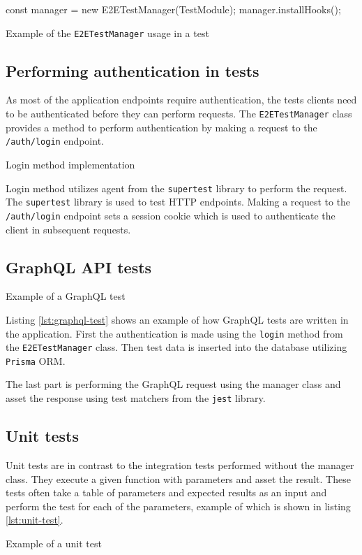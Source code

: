 \documentclass[../main.tex]{subfiles}
\begin{document}
\begin{listing}[H]
  \begin{tscode}
    const manager = new E2ETestManager(TestModule);
    manager.installHooks();
  \end{tscode}
  \caption{Example of the \texttt{E2ETestManager} usage in a test}
\end{listing}

\subsection{Performing authentication in tests}

As most of the application endpoints require authentication, the tests clients need to be authenticated before they can perform requests.
The \texttt{E2ETestManager} class provides a method to perform authentication by making a request to the \texttt{/auth/login} endpoint.

\begin{listing}[H]
  \caption{Login method implementation}
\end{listing}

Login method utilizes agent from the \texttt{supertest} library to perform the request. The \texttt{supertest} library is used to test HTTP endpoints.
Making a request to the \texttt{/auth/login} endpoint sets a session cookie which is used to authenticate the client in subsequent requests.

\subsection{GraphQL API tests}

\begin{listing}[H]
  \caption{Example of a GraphQL test}
  \label{lst:graphql-test}
\end{listing}

Listing \ref{lst:graphql-test} shows an example of how GraphQL tests are written in the application.
First the authentication is made using the \texttt{login} method from the \texttt{E2ETestManager} class.
Then test data is inserted into the database utilizing \texttt{Prisma} ORM.

The last part is performing the GraphQL request using the manager class and asset the response using test matchers from the \texttt{jest} library.

\subsection{Unit tests}

Unit tests are in contrast to the integration tests performed without the manager class. They execute a given function with parameters and asset the result.
These tests often take a table of parameters and expected results as an input and perform the test for each of the parameters, example of which is shown in listing \ref{lst:unit-test}.

\begin{listing}[H]
  \caption{Example of a unit test}
  \label{lst:unit-test}
\end{listing}
\end{document}
